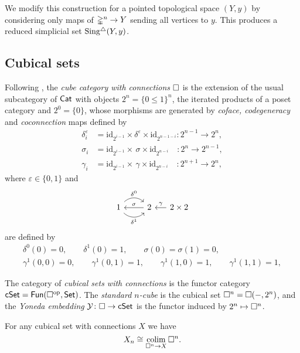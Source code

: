 We modify this construction for a pointed topological space $(Y, y)$ by considering only maps of $\mathbb{\Delta}^n \to Y$ sending all vertices to $y$.
This produces a reduced simplicial set $\operatorname{Sing^{\triangle}}(Y, y)$.

\subsection{Cubical sets} \label{ss:cubical sets}

Following \cite{brown1981cubes}, the \textit{cube category with connections} $\square$ is the extension of the usual subcategory of $\mathsf{Cat}$ with objects $2^n = \{0 \leq 1\}^n$, the iterated products of a poset category and $2^0 = \{0\}$, whose morphisms are generated by \textit{coface, codegeneracy} and \textit{coconnection} maps defined by
\begin{align*}
\delta_i^\varepsilon & =
\mathrm{id}_{2^{i-1}} \times \delta^\varepsilon \times \mathrm{id}_{2^{n-1-i}} \colon 2^{n-1} \to 2^n, \\
\sigma_i & =
\mathrm{id}_{2^{i-1}} \times \, \sigma \times \mathrm{id}_{2^{n-i}} \quad \colon 2^{n} \to 2^{n-1}, \\
\gamma_i & =
\mathrm{id}_{2^{i-1}} \times \, \gamma \times \mathrm{id}_{2^{n-i}} \quad \colon 2^{n+1} \to 2^{n},
\end{align*}
where $\varepsilon \in \{0,1\}$ and
\begin{equation*}
\begin{tikzcd}
1 \arrow[r, out=45, in=135, "\delta^0"] \arrow[r, out=-45, in=-135, "\delta^1"'] & 2 \arrow[l, "\sigma"'] &[-10pt] \arrow[l, "\gamma"'] 2 \times 2
\end{tikzcd}
\end{equation*}
are defined by
\begin{gather*}
\delta^0(0) = 0, \qquad
\delta^1(0) = 1, \qquad
\sigma(0) = \sigma(1) = 0, \qquad \\
\gamma^1(0,0) = 0, \qquad
\gamma^1(0,1) = 1, \qquad
\gamma^1(1,0) = 1, \qquad
\gamma^1(1,1) = 1, 
\end{gather*}

The category of \textit{cubical sets with connections} is the functor category $\mathsf{cSet} = \mathsf{Fun}(\square^{\mathrm{op}}, \mathsf{Set})$.
The \textit{standard $n$-cube} is the cubical set $\square^n = \square(-, 2^n)$, and the \textit{Yoneda embedding} $\operatorname{\mathcal{Y}} \colon \square \to \mathsf{cSet}$ is the functor induced by $2^n \mapsto \square^n$.

For any cubical set with connections $X$ we have
\begin{equation*}
X_n \cong \operatorname*{colim}_{\square^n \to X} \square^n.
\end{equation*}

